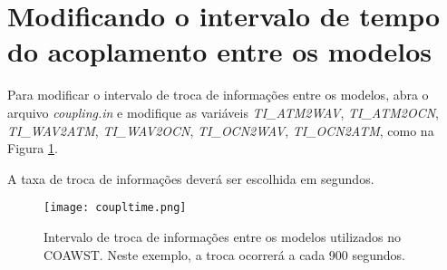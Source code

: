 \section{Modificando o intervalo de tempo do acoplamento entre os modelos}
\bigskip

\noindent Para modificar o intervalo de troca de informações entre os modelos, abra o arquivo \textit{coupling.in} e modifique as variáveis \textit{TI\_ATM2WAV}, \textit{TI\_ATM2OCN}, \textit{TI\_WAV2ATM}, \textit{TI\_WAV2OCN}, \textit{TI\_OCN2WAV}, \textit{TI\_OCN2ATM}, como na Figura \textcolor{bleu_cite}{\ref{taxaacopla}}.
\bigskip

\begin{tcolorbox}[enhanced,
  grow to left by=0cm,%
  grow to right by=0cm,%
  enlarge top by=0cm,%
  enlarge bottom by=0cm,%
  tcbox raise base,
  boxrule=1.0pt,
  left=18mm,
  colframe=red!50!black,coltext=red!25!black,colback=red!10!white,
  overlay={\begin{tcbclipinterior}\fill[red!75!blue!50!white] (frame.south west)
    rectangle node[text=white,font=\sffamily\bfseries\footnotesize,rotate=0] {ATENÇÃO} ([xshift=18mm]frame.north west);\end{tcbclipinterior}}]
A taxa de troca de informações deverá ser escolhida em segundos.
\end{tcolorbox}
\bigskip

\begin{figure}[H]
    \centering
    \texttt{[image: coupltime.png]}
    \caption{Intervalo de troca de informações entre os modelos utilizados no COAWST. Neste exemplo, a troca ocorrerá a cada 900 segundos.}
    \label{taxaacopla}
\end{figure}
\bigskip
